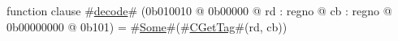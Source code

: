 function clause #\hyperref[zdecode]{decode}# (0b010010 @ 0b00000 @ rd : regno @ cb : regno @ 0b00000000 @ 0b101) = #\hyperref[zSome]{Some}#(#\hyperref[zCGetTag]{CGetTag}#(rd, cb))
